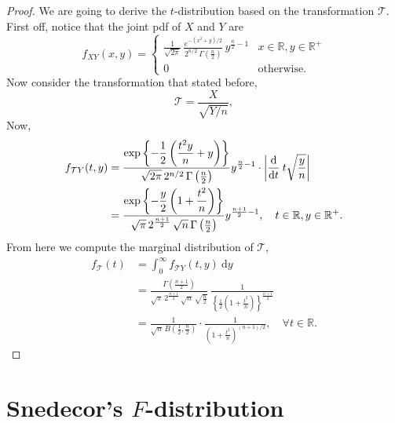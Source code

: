 \begin{proof}
    We are going to derive the $t$-distribution based on the transformation $\mathcal{T}$. 
    First off, notice that the joint pdf of $X$ and $Y$ are 
    \begin{equation}
        f_{XY}(x,y) = \begin{cases}
            \displaystyle \frac{1}{\sqrt{2\pi}} \, \frac{e^{-(x^2 + y)/2}}{2^{n/2} \, \Gamma \left( \frac{n}{2} \right)}\, 
            y^{\frac{n}{2} - 1} & x \in \mathbb{R}, y \in \mathbb{R}^+ \\[0.6em]
            0 & \text{otherwise}.
        \end{cases}
    \end{equation}
    Now consider the transformation that stated before,
    \begin{equation}
        \mathcal{T} = \frac{X}{\sqrt{Y/n}},
    \end{equation}
    Now, 
    \begin{align*}
        f_{\mathcal{T}Y} (t, y) &= \frac{\displaystyle \exp \left \{ -\frac{1}{2} \left(\frac{t^2 y}{n} + y \right) \right \} }{\sqrt{2\pi} \, 2^{n/2} \, \Gamma \left( \frac{n}{2} \right)} y^{\frac{n}{2} - 1} \cdot 
        \left \vert \odv{}{t} \> t \sqrt{\frac{y}{n}} \right \vert\\
        &= \frac{\displaystyle \exp \left \{ -\frac{y}{2} \left(1 + \frac{t^2}{n} \right) \right \} }{\sqrt{\pi} \, 2^{\frac{n+1}{2}} \, \sqrt{n} \, \Gamma \left( \frac{n}{2} \right)} y^{\frac{n+1}{2} - 1}, 
        \quad t \in \mathbb{R}, y \in \mathbb{R}^+.
    \end{align*}
    From here we compute the marginal distribution of $\mathcal{T}$,
    \begin{align*}
        f_{\mathcal{T}}(t) &= \int_{0}^{\infty} f_{\mathcal{T}Y} (t, y) \> \mathrm{d}y\\
        &= \frac{\Gamma \left(\frac{n+1}{2}\right) }{\sqrt{\pi} \, 2^{\frac{n+1}{2}} \, \sqrt{n} \, \sqrt{\frac{n}{2}}} \> 
        \frac{1}{\displaystyle \left\{ \frac{1}{2} \left( 1 + \frac{t^2}{n} \right) \right\}^{\frac{n+1}{2}}}\\
        &= \frac{1}{\sqrt{n} \, B\left( \frac{1}{2}, \frac{n}{2} \right)} \cdot 
        \frac{1}{\displaystyle \left(1 + \frac{t^2}{n} \right)^{(n+1)/2}}, \quad \forall t \in \mathbb{R}.
    \end{align*}
\end{proof}

\section{Snedecor's $F$-distribution}

